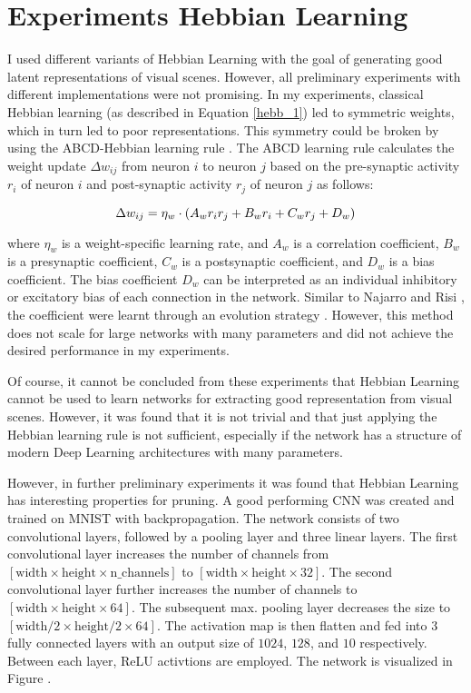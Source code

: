 \chapter{Experiments Hebbian Learning}
I used different variants of Hebbian Learning with the goal of generating good latent representations of visual scenes.
However, all preliminary experiments with different implementations were not promising.
In my experiments, classical Hebbian learning (as described in Equation \eqref{hebb_1}) led to symmetric weights, which in turn led to poor representations.
This symmetry could be broken by using the ABCD-Hebbian learning rule .
The ABCD learning rule calculates the weight update \(\Delta w_{ij}\) from neuron \(i\) to neuron \(j\) based on the pre-synaptic activity \(r_i\) of neuron \(i\) and post-synaptic activity \(r_j\) of neuron \(j\) as follows:

\begin{equation}\eqlbl{hebb_abcd}
	\Delta w_{ij} = \eta_w \cdot (A_wr_ir_j+B_wr_i+C_wr_j+D_w)
\end{equation}

where \(\eta_w\) is a weight-specific learning rate, and \(A_w\) is a correlation coefficient, \(B_w\) is a presynaptic coefficient, \(C_w\) is a postsynaptic coefficient, and \(D_w\) is a bias coefficient.
The bias coefficient \(D_w\) can be interpreted as an individual inhibitory or excitatory bias of each connection in the network.
Similar to Najarro and Risi , the coefficient were learnt through an evolution strategy .
However, this method does not scale for large networks with many parameters and did not achieve the desired performance in my experiments.

Of course, it cannot be concluded from these experiments that Hebbian Learning cannot be used to learn networks for extracting good representation from visual scenes.
However, it was found that it is not trivial and that just applying the Hebbian learning rule is not sufficient, especially if the network has a structure of modern Deep Learning architectures with many parameters.

However, in further preliminary experiments it was found that Hebbian Learning has interesting properties for pruning.
A good performing CNN was created and trained on MNIST with backpropagation.
The network consists of two convolutional layers, followed by a pooling layer and three linear layers.
The first convolutional layer increases the number of channels from \([\text{width} \times \text{height} \times \text{n\_channels}]\) to \([\text{width} \times \text{height} \times 32]\).
The second convolutional layer further increases the number of channels to \([\text{width} \times \text{height} \times 64]\).
The subsequent max. pooling layer decreases the size to \([\text{width}/2 \times \text{height}/2 \times 64]\).
The activation map is then flatten and fed into 3 fully connected layers with an output size of \(1024\), \(128\), and \(10\) respectively.
Between each layer, ReLU activtions are employed.
The network is visualized in Figure .

